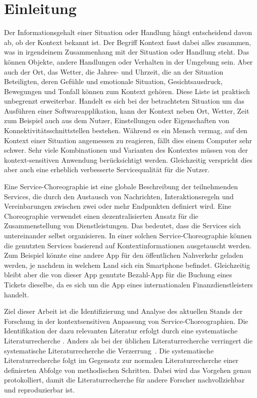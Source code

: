 \documentclass[conference,compsoc,ngerman]{IEEEtran}
\begin{document}
\section{Einleitung}
Der Informationsgehalt einer Situation oder Handlung hängt entscheidend davon ab, ob der Kontext bekannt ist. Der Begriff Kontext fasst dabei alles zusammen, was in irgendeinem Zusammenhang mit der Situation oder Handlung steht. Das können Objekte, andere Handlungen oder Verhalten in der Umgebung sein. Aber auch der Ort, das Wetter, die Jahres- und Uhrzeit, die an der Situation Beteiligten, deren Gefühle und emotionale Situation, Gesichtsausdruck, Bewegungen und Tonfall können zum Kontext gehören. Diese Liste ist praktisch unbegrenzt erweiterbar. Handelt es sich bei der betrachteten Situation um das Ausführen einer Softwareapplikation, kann der Kontext neben Ort, Wetter, Zeit zum Beispiel auch aus dem Nutzer, Einstellungen oder Eigenschaften von Konnektivitätsschnittstellen bestehen. Während es ein Mensch vermag, auf den Kontext einer Situation angemessen zu reagieren, fällt dies einem Computer sehr schwer. Sehr viele Kombinationen und Varianten des Kontextes müssen von der kontext-sensitiven Anwendung berücksichtigt werden. Gleichzeitig verspricht dies aber auch eine erheblich verbesserte Servicequalität für die Nutzer.

Eine Service-Choreographie ist eine globale Beschreibung der teilnehmenden Services, die durch den Austausch von Nachrichten, Interaktionsregeln und Vereinbarungen zwischen zwei oder mehr Endpunkten definiert wird. Eine Choreographie verwendet einen dezentralisierten Ansatz für die Zusammenstellung von Dienstleistungen. Das bedeutet, dass die Services sich untereinander selbst organisieren. In einer solchen Service-Choreographie können die genutzten Services basierend auf Kontextinformationen ausgetauscht werden. Zum Beispiel könnte eine andere App für den öffentlichen Nahverkehr geladen werden, je nachdem in welchem Land sich ein Smartphone befindet. Gleichzeitig bleibt aber die von dieser App genutzte Bezahl-App für die Buchung eines Tickets dieselbe, da es sich um die App eines internationalen Finanzdienstleisters handelt.

Ziel dieser Arbeit ist die Identifizierung und Analyse des aktuellen Stands der Forschung in der kontextsensitiven Anpassung von Service-Choreographien. Die Identifikation der dazu relevanten Literatur erfolgt durch eine systematische Literaturrecherche \cite{budgen2006performing,kitchenham2009systematic}. Anders als bei der üblichen Literaturrecherche verringert die systematische Literaturrecherche die Verzerrung~\cite{keele2007guidelines}. Die systematische Literaturrecherche folgt im Gegensatz zur normalen Literaturrecherche einer definierten Abfolge von methodischen Schritten. Dabei wird das Vorgehen genau protokolliert, damit die Literaturrecherche für andere Forscher nachvollziehbar und reproduzierbar ist.
\end{document}
